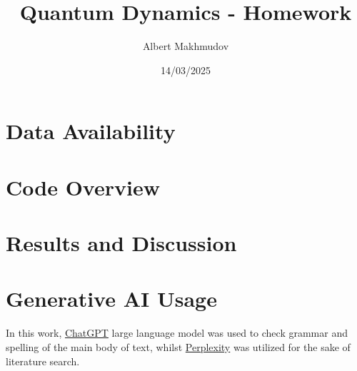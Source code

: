 \documentclass[12pt]{article}
\title{Quantum Dynamics - Homework}
\author{Albert Makhmudov}
\date{14/03/2025}
\begin{document}
\maketitle

\section*{Data Availability}

\section*{Code Overview}


\section*{Results and Discussion}


\section*{Generative AI Usage}
In this work, \href{https://chatgpt.com}{ChatGPT} large language model was used to check grammar and spelling of the main body of text, whilst \href{https://www.perplexity.ai}{Perplexity} was utilized for the sake of literature search.


\end{document}
